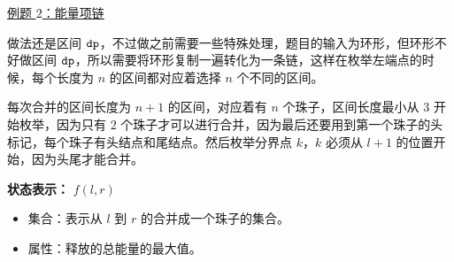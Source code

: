 \href{https://www.luogu.com.cn/problem/P1063}{例题 $2$：能量项链}

做法还是区间 $\tt dp$，不过做之前需要一些特殊处理，题目的输入为环形，但环形不好做区间 $\tt dp$，所以需要将环形复制一遍转化为一条链，这样在枚举左端点的时候，每个长度为 $n$ 的区间都对应着选择 $n$ 个不同的区间。

每次合并的区间长度为 $n + 1$ 的区间，对应着有 $n$ 个珠子，区间长度最小从 $3$ 开始枚举，因为只有 $2$ 个珠子才可以进行合并，因为最后还要用到第一个珠子的头标记，每个珠子有头结点和尾结点。然后枚举分界点 $k$，$k$ 必须从 $l + 1$ 的位置开始，因为头尾才能合并。

\textbf{状态表示：} $f(l, r)$
\begin{itemize}
\item 集合：表示从 $l$ 到 $r$ 的合并成一个珠子的集合。
\item 属性：释放的总能量的最大值。
\end{itemize}
